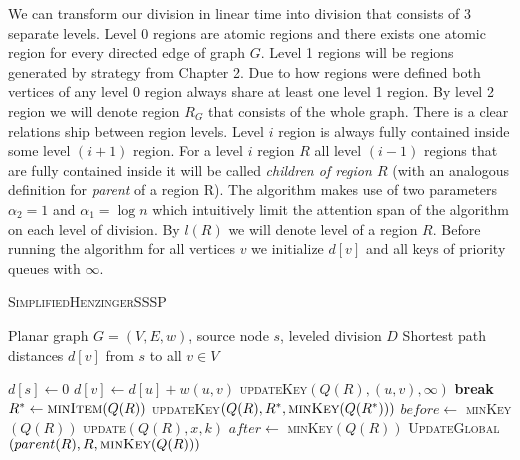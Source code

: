 We can transform our division in linear time into division that consists of 3 separate levels. Level 0 regions are atomic regions and there exists one atomic region for every directed edge of graph $G$. Level 1 regions will be regions generated by strategy from Chapter 2. Due to how regions were defined both vertices of any level 0 region always share at least one level 1 region. By level 2 region we will denote region $R_G$ that consists of the whole graph. There is a clear relations ship between region levels. Level $i$ region is always fully contained inside some level $(i+1)$ region. For a level $i$ region $R$ all level $(i-1)$ regions that are fully contained inside it will be called \emph{children of region $R$} (with an analogous definition for \emph{parent} of a region R). The algorithm makes use of two parameters $\alpha_2 = 1$ and $\alpha_1 = \log n$ which intuitively limit the attention span of the algorithm on each level of division. By $l(R)$ we will denote level of a region $R$. Before running the algorithm for all vertices $v$ we initialize $d[v]$ and all keys of priority queues with $\infty$.

\begin{algorithm}
\caption{\textsc{SimplifiedHenzingerSSSP}}\label{henzingerFormal}
\begin{algorithmic}[1]
\Require Planar graph $G=(V,E, w)$, source node $s$, leveled division $D$
\Ensure Shortest path distances $d[v]$ from $s$ to all $v \in V$

    \State $d[s] \gets 0$
        \State {}
    \EndFor
        \State {}
    \EndWhile
\EndProcedure
\State
{}
            \State $d[v] \gets d[u] + w(u, v)$
                \State {}
            \EndFor
        \EndIf
        \State \textsc{updateKey}$(Q(R), (u, v), \infty)$
    \Else
         
            \State \textbf{break}
            \EndIf
            \State $R^* \gets \textsc{minItem}(Q(R))$
            \State {}
            \State \textsc{updateKey}$(Q(R), R^*, \textsc{minKey}(Q(R^*)))$
        \End
    \EndIf
\EndProcedure
\State
{}
    \State $before \gets$ \textsc{minKey}$(Q(R))$
    \State \textsc{update}$(Q(R), x, k)$
    \State $after \gets$ \textsc{minKey}$(Q(R))$
    \State \textsc{UpdateGlobal}$(parent(R), R, \textsc{minKey}(Q(R)))$
    \EndIf
\EndProcedure

\end{algorithmic}
\end{algorithm}

